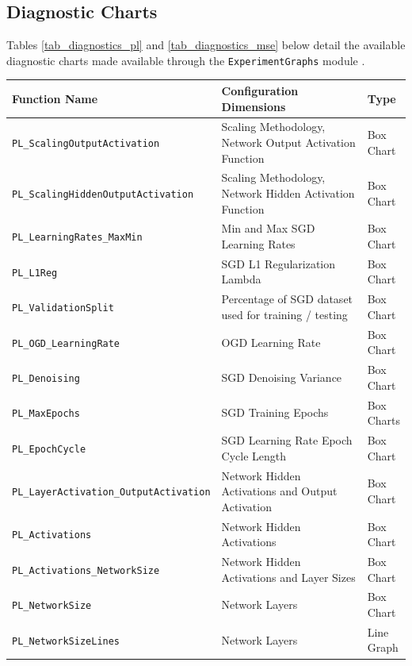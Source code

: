 \documentclass[a4paper,11pt,oneside]{article}
\theoremstyle{plain}
\theoremstyle{definition}
\begin{document}
	\newpage
	\subsection{Diagnostic Charts}\label{appendix_diagnostics}
	
	Tables \ref{tab_diagnostics_pl} and \ref{tab_diagnostics_mse} below detail the available diagnostic charts made available through the \texttt{ExperimentGraphs} module \citep{DCExperimentGraph}.
	
	\begin{longtable}{|p{0.5\linewidth}|p{0.4\linewidth}|p{0.1\linewidth}|}
		\hline
		\textbf{Function Name} &\textbf{Configuration Dimensions}&\textbf{Type}  \\\hline	
		\texttt{PL\_ScalingOutputActivation} & {Scaling Methodology, Network Output Activation Function}& {Box Chart} \\\hline
		\texttt{PL\_ScalingHiddenOutputActivation} & {Scaling Methodology, Network Hidden Activation Function}& {Box Chart} \\\hline
		\texttt{PL\_LearningRates\_MaxMin}& {Min and Max SGD Learning Rates} & {Box Chart} \\\hline
		\texttt{PL\_L1Reg} & {SGD L1 Regularization Lambda}& {Box Chart} \\\hline
		\texttt{PL\_ValidationSplit} & {Percentage of SGD dataset used for training / testing}& {Box Chart} \\\hline
		\texttt{PL\_OGD\_LearningRate}& {OGD Learning Rate} & {Box Chart} \\\hline
		\texttt{PL\_Denoising} & {SGD Denoising Variance}& {Box Chart} \\\hline
		\texttt{PL\_MaxEpochs} & {SGD Training Epochs}& {Box Charts} \\\hline
		\texttt{PL\_EpochCycle}& {SGD Learning Rate Epoch Cycle Length} & {Box Chart} \\\hline
		\texttt{PL\_LayerActivation\_OutputActivation} & {Network Hidden Activations and Output Activation}& {Box Chart} \\\hline
		\texttt{PL\_Activations} & {Network Hidden Activations}& {Box Chart} \\\hline
		\texttt{PL\_Activations\_NetworkSize}& {Network Hidden Activations and Layer Sizes} & {Box Chart} \\\hline
		\texttt{PL\_NetworkSize}& {Network Layers} & {Box Chart} \\\hline
		\texttt{PL\_NetworkSizeLines}& {Network Layers} & {Line Graph} \\\hline

\end{longtable}
\end{document}
